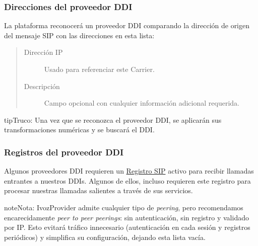 \documentclass[letterpaper,10pt,spanish]{sphinxmanual}
\begin{document}
\subsubsection{Direcciones del proveedor DDI}
\label{administration_portal/brand/providers/ddi_providers:ddi-provider-addresses}
La plataforma reconocerá un proveedor DDI comparando la dirección de origen del mensaje SIP con las direcciones en esta lista:
\begin{quote}
\begin{description}
\item[{Dirección IP}] \leavevmode
Usado para referenciar este Carrier.

\item[{Descripción}] \leavevmode
Campo opcional con cualquier información adicional requerida.

\end{description}
\end{quote}

\begin{notice}{tip}{Truco:}
Una vez que se reconozca el proveedor DDI, se aplicarán sus transformaciones numéricas y se buscará el DDI.
\end{notice}


\subsubsection{Registros del proveedor DDI}
\label{administration_portal/brand/providers/ddi_providers:ddi-provider-registrations}
Algunos proveedores DDI requieren un \href{https://tools.ietf.org/html/rfc3261\#section-10}{Registro SIP} activo para recibir llamadas entrantes a nuestros DDIs. Algunos de ellos, incluso requieren este registro para procesar nuestras llamadas salientes a través de sus servicios.

\begin{notice}{note}{Nota:}
IvozProvider admite cualquier tipo de \emph{peering}, pero recomendamos encarecidamente \emph{peer to peer peerings}: sin autenticación, sin registro y validado por IP. Esto evitará tráfico innecesario (autenticación en cada sesión y registros periódicos) y simplifica su configuración, dejando esta lista vacía.
\end{notice}
\end{document}
